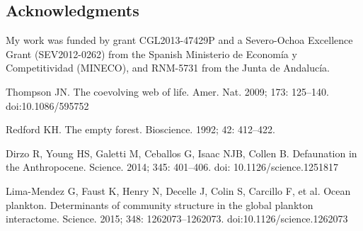 \documentclass[10pt,letterpaper]{article}
\begin{document}
\subsection*{Acknowledgments}
My work was funded by grant CGL2013-47429P and a Severo-Ochoa Excellence Grant (SEV2012-0262) from the Spanish Ministerio de Econom\'ia y Competitividad (MINECO), and RNM-5731 from the Junta de Andaluc\'ia. 

\nolinenumbers

\begin{thebibliography}{10}
Thompson JN. The coevolving web of life. Amer. Nat. 2009; 173: 125–140. doi:10.1086/595752

Redford KH. The empty forest. Bioscience. 1992; 42: 412–422. 

Dirzo R, Young HS, Galetti M, Ceballos G, Isaac NJB, Collen B. Defaunation in the Anthropocene. Science. 2014; 345: 401–406. doi: 10.1126/science.1251817

Lima-Mendez G, Faust K, Henry N, Decelle J, Colin S, Carcillo F, et al. Ocean plankton. Determinants of community structure in the global plankton interactome. Science. 2015; 348: 1262073–1262073. doi:10.1126/science.1262073

\end{thebibliography}
\end{document}
